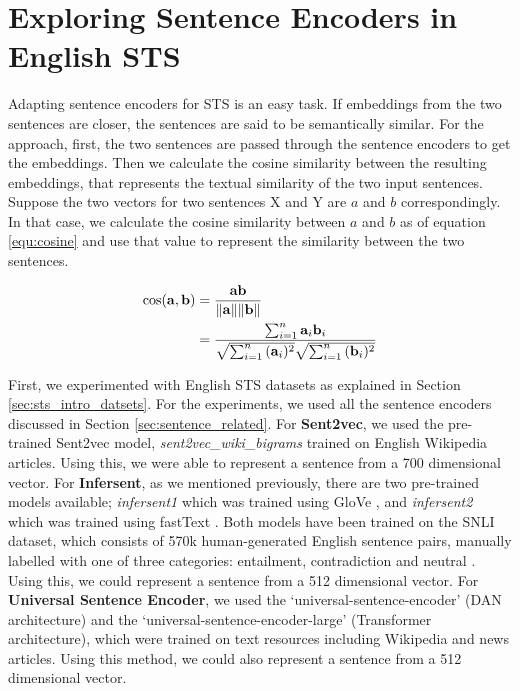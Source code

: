 \section{Exploring Sentence Encoders in English STS}
\label{sec:sentence_method}
Adapting sentence encoders for STS is an easy task.  If embeddings from the two sentences are closer, the sentences are said to be semantically similar. For the approach, first, the two sentences are passed through the sentence encoders to get the embeddings. Then we calculate the cosine similarity between the resulting embeddings, that represents the textual similarity of the two input sentences. Suppose the two vectors for two sentences X and Y are $a$ and $b$ correspondingly. In that case, we calculate the cosine similarity between $a$ and $b$ as of equation \ref{equ:cosine} and use that value to represent the similarity between the two sentences. 

\begin{equation}
	\label{equ:cosine}
	\begin{aligned}
		\cos ({\bf a},{\bf b})= {} & {{\bf a} {\bf b} \over \|{\bf a}\| \|{\bf b}\|} \\
		= {} & \frac{ \sum_{i=1}^{n}{{\bf a}_i{\bf b}_i} }{ \sqrt{\sum_{i=1}^{n}{({\bf a}_i)^2}} \sqrt{\sum_{i=1}^{n}{({\bf b}_i)^2}} }
	\end{aligned}
\end{equation}

First, we experimented with English STS datasets as explained in Section \ref{sec:sts_intro_datsets}. For the experiments, we used all the sentence encoders discussed in Section \ref{sec:sentence_related}. For \textbf{Sent2vec}, we used the pre-trained Sent2vec model, \textit{sent2vec\_wiki\_bigrams} trained on English Wikipedia articles. Using this, we were able to represent a sentence from a 700 dimensional vector. For \textbf{Infersent}, as we mentioned previously, there are two pre-trained models available; \textit{infersent1} which was trained using GloVe \autocite{pennington-etal-2014-glove}, and \textit{infersent2} which was trained using fastText \autocite{mikolov-etal-2018-advances}. Both models have been trained on the SNLI dataset, which consists of 570k human-generated English sentence pairs, manually labelled with one of three categories: entailment, contradiction and neutral \autocite{bowman-etal-2015-large}. Using this, we could represent a sentence from a 512 dimensional vector. For \textbf{Universal Sentence Encoder}, we used the `universal-sentence-encoder' (DAN architecture) and the `universal-sentence-encoder-large' (Transformer architecture), which were trained on text resources including Wikipedia and news articles. Using this method, we could also represent a sentence from a 512 dimensional vector.

